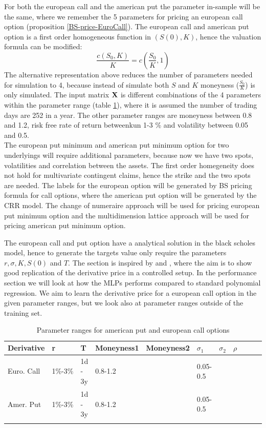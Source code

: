 For both the european call and the american put the parameter in-sample will be the same, where we remember the 5 parameters for pricing an european call option (proposition \ref{BS-price-EuroCall}). The european call and american put option is a first order homogeneous function in $(S(0),K)$, hence the valuation formula can be modified:
$$\frac{c(S_0,K)}{K}=c(\frac{S_0}{K},1)$$
The alternative representation above reduces the number of parameters needed for simulation to 4, because instead of simulate both $S$ and $K$ moneyness ($\frac{S_0}{K}$) is only  simulated. The input matrix $\mathbf{X}$ is different combinations of the 4 parameters within the parameter range (table \ref{tab:euroParRange}), where it is assumed the number of trading days are 252 in a year. The other parameter ranges are moneyness between 0.8 and 1.2, risk free rate of return betweenkun 1-3 \% and volatility between 0.05 and 0.5. \\

The european put minimum and american put minimum option for two underlyings will require additional parameters, because now we have two spots, volatilities and correlation between the assets. The first order homegeneity does not hold for multivariate contingent claims, hence the strike and the two spots are needed.
The labels for the european option will be generated by BS pricing formula for call options, where the american put option will be generated by the CRR model. The change of numeraire approach will be used for pricing european put minimum option and the multidimension lattice approach will be used for pricing american put minimum option.
   

The european call and put option have a analytical solution in the black scholes model, hence to generate the targets value only require the parameters $r, \sigma, K, S(0)$ and $T$. The section is inspired by \parencite{HirsaAli2019} and \parencite{GasparRaquel20}, where the aim is to show good replication of the derivative price in a controlled setup. In the performance section we will look at how the MLPs performs compared to standard polynomial regression. We aim to learn the derivative price for a european call option in the given parameter ranges, but we look also at parameter ranges outside of the training set.

\begin{table}[H]
\caption[Parameter Ranges For MLPs]{Parameter ranges for american put and european call options}
\label{tab:euroParRange}
\centering
\begin{tabular}{l l l l l l l l l l l}
\toprule
\textbf{Derivative} & \textbf{r} & \textbf{T} & \textbf{Moneyness1} & \textbf{Moneyness2} & $\sigma_1$ & $\sigma_2$ & $\rho$ \\
\midrule
Euro. Call & 1\%-3\% & 1d - 3y & 0.8-1.2 & & 0.05-0.5 & &\\ 
Amer. Put & 1\%-3\% & 1d - 3y & 0.8-1.2 & & 0.05-0.5 & & \\ 
\bottomrule\\
\end{tabular}
\end{table}

